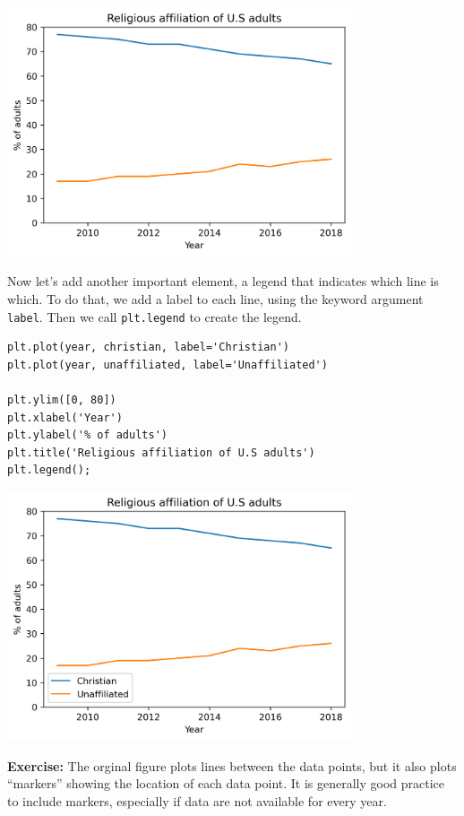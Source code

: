 \begin{center}
\includegraphics[width=4in]{06_plotting_files/06_plotting_31_0.png}
\end{center}

Now let's add another important element, a legend that indicates which
line is which. To do that, we add a label to each line, using the
keyword argument \passthrough{\lstinline!label!}. Then we call
\passthrough{\lstinline!plt.legend!} to create the legend.

\begin{lstlisting}[]
plt.plot(year, christian, label='Christian')
plt.plot(year, unaffiliated, label='Unaffiliated')

plt.ylim([0, 80])
plt.xlabel('Year')
plt.ylabel('% of adults')
plt.title('Religious affiliation of U.S adults')
plt.legend();
\end{lstlisting}

\begin{center}
\includegraphics[width=4in]{06_plotting_files/06_plotting_33_0.png}
\end{center}

\textbf{Exercise:} The orginal figure plots lines between the data
points, but it also plots ``markers'' showing the location of each data
point. It is generally good practice to include markers, especially if
data are not available for every year.

